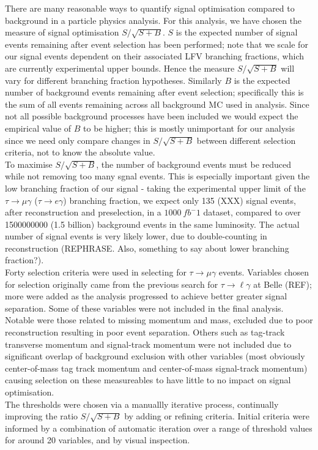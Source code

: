 \documentclass[12pt]{thesis}  %
\begin{document}
There are many reasonable ways to quantify signal optimisation compared to background in a particle physics analysis. For this analysis, we have chosen the measure of signal optimisation $S/\sqrt{S+B}$. $S$ is the expected number of signal events remaining after event selection has been performed; note that we scale for our signal events dependent on their associated LFV branching fractions, which are currently experimental upper bounds. Hence the measure $S/\sqrt{S+B}$ will vary for different branching fraction hypotheses. 
Similarly $B$ is the expected number of background events remaining after event selection; specifically this is the sum of all events remaining across all background MC used in analysis. Since not all possible background processes have been included we would expect the empirical value of $B$ to be higher; this is mostly unimportant for our analysis since we need only compare changes in $S/\sqrt{S+B}$ between different selection criteria, not to know the absolute value.
\\
To maximise $S/\sqrt{S+B}$, the number of background events must be reduced while not removing too many sgnal events. This is especially important given the low branching fraction of our signal - taking the experimental upper limit of the $\tau\to\mu\gamma$ ($\tau\to e\gamma$) branching fraction, we expect only 135 (XXX) signal events, after reconstruction and preselection, in a $\SI{1000}{fb^-1}$ dataset, compared to over \num{1500000000} (1.5 billion) background events in the same luminosity. The actual number of signal events is very likely lower, due to double-counting in reconstruction (REPHRASE. Also, something to say about lower branching fraction?).
\\
Forty selection criteria were used in selecting for $\tau\to\mu\gamma$ events. Variables chosen for selection originally came from the previous search for $\tau\to\ell\gamma$ at Belle (REF); more were added as the analysis progressed to achieve better greater signal separation. Some of these variables were not included in the final analysis. Notable were those related to missing momentum and mass, excluded due to poor reconstruction resulting in poor event separation. Others such as tag-track transverse momentum and signal-track momentum were not included due to significant overlap of background exclusion with other variables (most obviously center-of-mass tag track momentum and center-of-mass signal-track momentum) causing selection on these measureables to have little to no impact on signal optimisation.
\\
The thresholds were chosen via a manuallly iterative process, continually improving the ratio $S/\sqrt{S+B}$ by adding or refining criteria. Initial criteria were informed by a combination of automatic iteration over a range of threshold values for around 20 variables, and by visual inspection.
\end{document}
